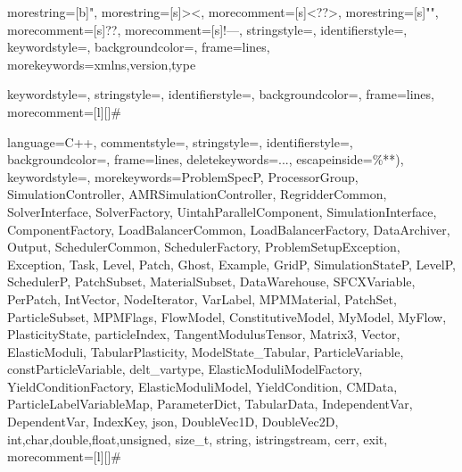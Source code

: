 
{
  morestring=[b]",
  morestring=[s]{>}{<},
  morecomment=[s]{<?}{?>},
  morestring=[s]{"}{"},
  morecomment=[s]{?}{?},
  morecomment=[s]{!--}{--},
  stringstyle=\color{black},
  identifierstyle=\color{DarkBlue},
  keywordstyle=\color{Brickred},
  backgroundcolor=\color{background},
  frame=lines,
  morekeywords={xmlns,version,type}%
}

{
  keywordstyle=\color{Brickred},
  stringstyle=\color{red},
  identifierstyle=\color{DarkBlue},
  backgroundcolor=\color{background},
  frame=lines,
  morecomment=[l][\color{magenta}]{\#}
}

{
  language=C++,
  commentstyle=\color{dkgreen}\upshape,   
  stringstyle=\color{red},
  identifierstyle=\color{DarkBlue},
  backgroundcolor=\color{background},
  frame=lines,
  deletekeywords={...},
  escapeinside={\%*}{*)},
  keywordstyle=\color{Brickred},
  morekeywords={ProblemSpecP, ProcessorGroup, SimulationController,%
                AMRSimulationController, RegridderCommon, SolverInterface,%
                SolverFactory, UintahParallelComponent, SimulationInterface,%
                ComponentFactory, LoadBalancerCommon, LoadBalancerFactory,%
                DataArchiver, Output, SchedulerCommon, SchedulerFactory,%
                ProblemSetupException, Exception,%
                Task, Level, Patch, Ghost, Example,%
                GridP, SimulationStateP, LevelP, SchedulerP,%
                PatchSubset, MaterialSubset, DataWarehouse,%
                SFCXVariable, PerPatch, IntVector, NodeIterator,%
                VarLabel, MPMMaterial, PatchSet, ParticleSubset,%
                MPMFlags, FlowModel, ConstitutiveModel, MyModel, MyFlow, PlasticityState,%
                particleIndex, TangentModulusTensor, Matrix3, Vector,
                ElasticModuli, TabularPlasticity, ModelState_Tabular, ParticleVariable,
                constParticleVariable, delt_vartype, ElasticModuliModelFactory,%
                YieldConditionFactory, ElasticModuliModel, YieldCondition, CMData,
                ParticleLabelVariableMap, ParameterDict, TabularData, IndependentVar,
                DependentVar, IndexKey, json, DoubleVec1D, DoubleVec2D,
                int,char,double,float,unsigned, size_t,%
                string, istringstream, cerr, exit}, 
  morecomment=[l][\color{magenta}]{\#}
}




